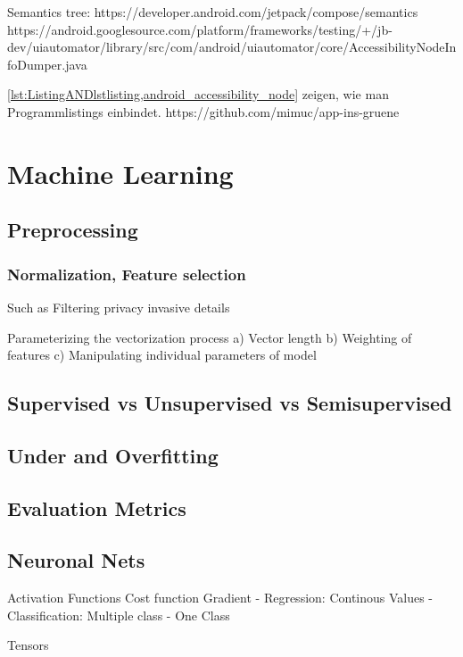 Semantics tree:
https://developer.android.com/jetpack/compose/semantics
https://android.googlesource.com/platform/frameworks/testing/+/jb-dev/uiautomator/library/src/com/android/uiautomator/core/AccessibilityNodeInfoDumper.java

\autoref{lst:ListingANDlstlisting,android_accessibility_node} zeigen, wie man Programmlistings einbindet.
https://github.com/mimuc/app-ins-gruene



\section{Machine Learning}
\subsection{Preprocessing}
\subsubsection{Normalization, Feature selection}

Such as Filtering privacy invasive details

Parameterizing the vectorization process
             a) Vector length
             b) Weighting of features
             c) Manipulating individual parameters of model
             
\subsection{Supervised vs Unsupervised vs Semisupervised}
\subsection{Under and Overfitting}
\subsection{Evaluation Metrics}
\subsection{Neuronal Nets}
Activation Functions
Cost function
Gradient
- Regression: Continous Values
- Classification: Multiple class
- One Class


Tensors

